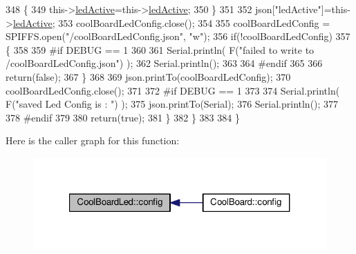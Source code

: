 \begin{DoxyCode}
348             \{
349                 this->\hyperlink{class_cool_board_led_a5f17c135516fcf4b44ea8a096ba0177a}{ledActive}=this->\hyperlink{class_cool_board_led_a5f17c135516fcf4b44ea8a096ba0177a}{ledActive};          
350             \}
351             
352             json[\textcolor{stringliteral}{"ledActive"}]=this->\hyperlink{class_cool_board_led_a5f17c135516fcf4b44ea8a096ba0177a}{ledActive};
353             coolBoardLedConfig.close();
354             
355             coolBoardLedConfig = SPIFFS.open(\textcolor{stringliteral}{"/coolBoardLedConfig.json"}, \textcolor{stringliteral}{"w"});
356             \textcolor{keywordflow}{if}(!coolBoardLedConfig)
357             \{
358             
359 \textcolor{preprocessor}{            #if DEBUG == 1 }
360 
361                 Serial.println( F(\textcolor{stringliteral}{"failed to write to /coolBoardLedConfig.json"}) );
362                 Serial.println();
363 
364 \textcolor{preprocessor}{            #endif}
365 
366                 \textcolor{keywordflow}{return}(\textcolor{keyword}{false});          
367             \}
368 
369             json.printTo(coolBoardLedConfig);
370             coolBoardLedConfig.close();
371 
372 \textcolor{preprocessor}{        #if DEBUG == 1}
373     
374             Serial.println( F(\textcolor{stringliteral}{"saved Led Config is : "}) );
375             json.printTo(Serial);
376             Serial.println();
377 
378 \textcolor{preprocessor}{        #endif}
379 
380             \textcolor{keywordflow}{return}(\textcolor{keyword}{true}); 
381         \}
382     \}   
383 
384 \}               
\end{DoxyCode}
Here is the caller graph for this function\+:\nopagebreak
\begin{figure}[H]
\begin{center}
\leavevmode
\includegraphics[width=321pt]{de/dc0/class_cool_board_led_a1b60e5e30bea96c49ed62ed1bf1ffc8b_icgraph}
\end{center}
\end{figure}
\mbox{\label{class_cool_board_led_a69f323359e0c9f797422f2152b5d41ef}} 
